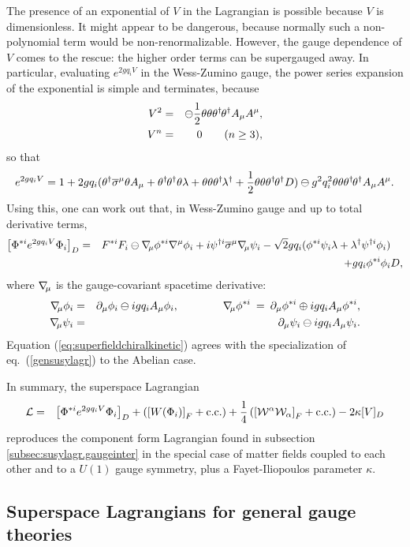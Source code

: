 \documentclass[11pt]{article}
\def\BDpos{}
\def\BDplus{+}
\def\BDminus{-}
\def\thetasigmamuthetadagger{\theta\sigma^\mu\theta^\dagger}
\def\BDpos{-}
\def\BDplus{-}
\def\BDminus{+}
\def\thetasigmamuthetadagger{\theta^\dagger\sigmabar^\mu\theta}
\def\BDpos{\oplus}
\def\BDplus{\oplus}
\def\BDminus{\ominus}
\def\thetasigmamuthetadagger{\theta\sigma^\mu\theta^\dagger}
\def\BDpos{\ominus}
\def\BDplus{\ominus}
\def\BDminus{\oplus}
\def\thetasigmamuthetadagger{\theta^\dagger\sigmabar^\mu\theta}
\newcommand{\thdthd}{\theta^\dagger\hspace{-1pt}\theta^\dagger}
\newcommand{\nablasubmu}{\nabla\hspace{-2pt}{}_\mu}
\def\beq{\begin{eqnarray}}
\def\eeq{\end{eqnarray}}
\def\sigmabar{\overline\sigma}
\begin{document}
The presence of an exponential of $V$ in the Lagrangian is possible 
because $V$ is dimensionless. It might appear to be dangerous, because 
normally such a non-polynomial term would be non-renormalizable. However, 
the gauge dependence of $V$ comes to the rescue: the higher order 
terms can be supergauged away. In particular, evaluating $e^{2 g q_i V}$ 
in the Wess-Zumino gauge, the power series expansion of the exponential 
is simple and terminates, because
\beq
V^2 &=& \BDpos\frac{1}{2} 
\theta\theta\thdthd A_\mu A^\mu,
\\
V^n &=& 0\qquad(n\geq 3),
\eeq
so that 
\beq
e^{2 g q_i V} = 1 + 2 g q_i (\thetasigmamuthetadagger  A_\mu + 
\thdthd \theta \lambda 
+ \theta\theta \theta^\dagger\hspace{-1pt} \lambda^\dagger +
\frac{1}{2} \theta\theta\thdthd D )
\BDplus g^2 q_i^2 \theta\theta\thdthd A_\mu A^\mu.
\eeq
Using this, one can work out that, in Wess-Zumino gauge and up to total 
derivative terms,
\beq
\left [ \Phi^{*i} e^{2 g q_i V} \Phi_i \right ]_D 
&=&
F^{*i} F_i 
\BDplus \nablasubmu \phi^{*i} \nabla^\mu \phi_i
+ i \psi^{\dagger i} \sigmabar^\mu \nablasubmu \psi_i
- \sqrt{2} g q_i 
( \phi^{*i} \psi_i \lambda + \lambda^\dagger \psi^{\dagger i} \phi_i)
\phantom{xx}
\nonumber \\ &&
+ g q_i  \phi^{*i} \phi_i D,
\label{eq:superfieldchiralkinetic}
\eeq 
where $\nablasubmu$ is the gauge-covariant spacetime derivative:
\beq
\nablasubmu \phi_i &=& \partial_\mu \phi_i \BDplus i g q_i A_\mu \phi_i,
\qquad\qquad
\nablasubmu \phi^{*i} \>=\> \partial_\mu \phi^{*i} \BDminus i g q_i A_\mu 
\phi^{*i},
\\
\nablasubmu \psi_i &=& \partial_\mu \psi_i \BDplus i g q_i A_\mu \psi_i .
\eeq
Equation (\ref{eq:superfieldchiralkinetic}) agrees with the 
specialization of eq.~(\ref{gensusylagr}) to the Abelian case.

In summary, the superspace Lagrangian
\beq
{\cal L} &=& 
 \left [ \Phi^{*i} e^{2 g q_i V} \Phi_i \right ]_D
+ \left (\left [W(\Phi_i)\right ]_F + {\rm c.c.} \right )
+
\frac{1}{4}\left (\left [{\cal W}^\alpha {\cal W}_\alpha \right ]_F 
+ {\rm c.c.} \right )
-2 \kappa [V]_D
\eeq
reproduces the component form Lagrangian found in 
subsection \ref{subsec:susylagr.gaugeinter}
in the special case of matter fields coupled to each other and to a 
$U(1)$ gauge symmetry, plus a Fayet-Iliopoulos parameter $\kappa$.

\subsection{Superspace Lagrangians for general 
gauge theories\label{subsec:superspacelagrnonabelian}}
\setcounter{equation}{0}
\setcounter{footnote}{2}
\end{document}
